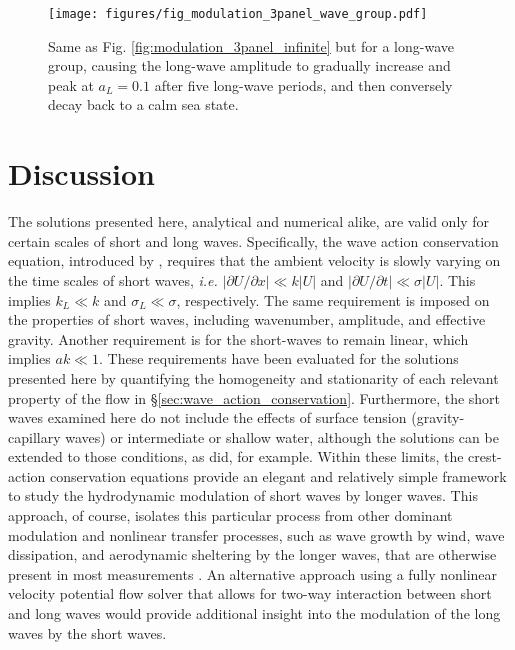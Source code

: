 \documentclass[lineno]{jfm}
\begin{document}
\begin{figure}
\centering
\texttt{[image: figures/fig\_modulation\_3panel\_wave\_group.pdf]}
\caption{
  Same as Fig. \ref{fig:modulation_3panel_infinite} but for a long-wave group,
  causing the long-wave amplitude to gradually increase and peak at $a_L = 0.1$
  after five long-wave periods, and then conversely decay back to a calm sea state.
}
\label{fig:modulation_3panel_groups}
\end{figure}

\section{Discussion}
\label{section:discussion}

The solutions presented here, analytical and numerical alike, are valid only
for certain scales of short and long waves.
Specifically, the wave action conservation equation, introduced by
\citet{bretherton1968wavetrains}, requires that the ambient velocity is slowly
varying on the time scales of short waves, \textit{i.e.}
$|\partial U / \partial x| \ll k |U|$
and $|\partial U / \partial t| \ll \sigma |U|$.
This implies $k_L \ll k$ and $\sigma_L \ll \sigma$, respectively.
The same requirement is imposed on the properties of short waves, including
wavenumber, amplitude, and effective gravity.
Another requirement is for the short-waves to remain linear, which implies
$a k \ll 1$.
These requirements have been evaluated for the solutions presented here by
quantifying the homogeneity and stationarity of each relevant property of the
flow in \S\ref{sec:wave_action_conservation}.
Furthermore, the short waves examined here do not include the effects of
surface tension (gravity-capillary waves) or intermediate or shallow water,
although the solutions can be extended to those conditions, as
\citet{phillips1981dispersion} did, for example.
Within these limits, the crest-action conservation equations provide an
elegant and relatively simple framework to study the hydrodynamic modulation
of short waves by longer waves.
This approach, of course, isolates this particular process from other
dominant modulation and nonlinear transfer processes, such as wave growth
by wind, wave dissipation, and aerodynamic sheltering by the longer waves,
that are otherwise present in most measurements
\citep[e.g.,][]{plant1986two,laxague2017gravity}.
An alternative approach using a fully nonlinear velocity potential flow solver
that allows for two-way interaction between short and long waves would provide
additional insight into the modulation of the long waves by the short waves.
\end{document}
